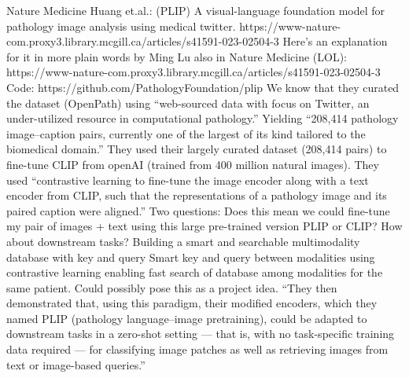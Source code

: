 \documentclass{article}%
\begin{document}
%
Nature Medicine Huang et.al.: (PLIP) A visual{-}language foundation model for pathology image analysis using medical twitter. https://www{-}nature{-}com.proxy3.library.mcgill.ca/articles/s41591{-}023{-}02504{-}3 %
\newline%
\newline%
%
Here’s an explanation for it in more plain words by Ming Lu also in Nature Medicine (LOL): https://www{-}nature{-}com.proxy3.library.mcgill.ca/articles/s41591{-}023{-}02504{-}3 %
\newline%
\newline%
%
Code: https://github.com/PathologyFoundation/plip %
\newline%
\newline%
%
We know that they curated the dataset (OpenPath) using “web{-}sourced data with focus on Twitter, an under{-}utilized resource in computational pathology.” Yielding “208,414 pathology image–caption pairs, currently one of the largest of its kind tailored to the biomedical domain.”%
\newline%
\newline%
%
They used their largely curated dataset (208,414 pairs) to fine{-}tune CLIP from openAI (trained from 400 million natural images). They used “contrastive learning to fine{-}tune the image encoder along with a text encoder from CLIP, such that the representations of a pathology image and its paired caption were aligned.”%
\newline%
\newline%
%
Two questions: %
\newline%
\newline%
%
Does this mean we could fine{-}tune my pair of images + text using this large pre{-}trained version PLIP or CLIP? How about downstream tasks? %
\newline%
\newline%
%
Building a smart and searchable multimodality database with key and query  Smart key and query between modalities using contrastive learning enabling fast search of database among modalities for the same patient. Could possibly pose this as a project idea. %
\newline%
\newline%
%
“They then demonstrated that, using this paradigm, their modified encoders, which they named PLIP (pathology language–image pretraining), could be adapted to downstream tasks in a zero{-}shot setting — that is, with no task{-}specific training data required — for classifying image patches as well as retrieving images from text or image{-}based queries.”%
\end{document}
